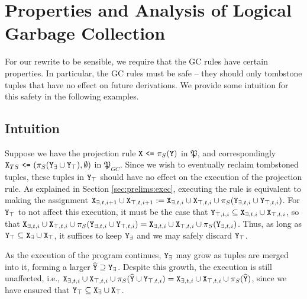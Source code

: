 
\section{Properties and Analysis of Logical Garbage Collection}
\label{sec:logical}
For our rewrite to be sensible, we require that the GC rules have certain properties.
In particular, the GC rules must be safe -- they should only tombstone tuples that have no effect on future derivations.
We provide some intuition for this safety in the following examples.

\setcounter{subsection}{-1}
\subsection{Intuition}
\begin{example}
Suppose we have the projection rule $\tt{X} ~\tt{<=}~ \pi_S(\tt{Y})$ in $\mathfrak{P}$, and correspondingly $\tt{X}_{TS} ~\tt{<=}~ (\pi_S(\tt{Y}_\exists \cup \tt{Y}_\top), \emptyset)$ in $\mathfrak{P}_{GC}$.
Since we wish to eventually reclaim tombstoned tuples, these tuples in $\tt{Y}_\top$ should have no effect on the execution of the projection rule.
As explained in Section \ref{sec:prelims:exec}, executing the rule is equivalent to making the assignment $\tt{X}_{\exists,t,i+1} \cup \tt{X}_{\top,t,i+1} := \tt{X}_{\exists,t,i} \cup \tt{X}_{\top,t,i} \cup \pi_S(\tt{Y}_{\exists,t,i} \cup \tt{Y}_{\top,t,i})$.
For $\tt{Y}_\top$ to not affect this execution, it must be the case that $\tt{Y}_{\top,t,i} \subseteq \tt{X}_{\exists,t,i} \cup \tt{X}_{\top,t,i}$, so that $\tt{X}_{\exists,t,i} \cup \tt{X}_{\top,t,i} \cup \pi_S(\tt{Y}_{\exists,t,i} \cup \tt{Y}_{\top,t,i}) = \tt{X}_{\exists,t,i} \cup \tt{X}_{\top,t,i} \cup \pi_S(\tt{Y}_{\exists,t,i})$.
Thus, as long as $\tt{Y}_\top \subseteq \tt{X}_\exists \cup \tt{X}_\top$, it suffices to keep $\tt{Y}_\exists$ and we may safely discard $\tt{Y}_\top$.

As the execution of the program continues, $\tt{Y}_\exists$ may grow as tuples are merged into it, forming a larger $\widehat{\tt{Y}} \supseteq \tt{Y}_\exists$.
Despite this growth, the execution is still unaffected, i.e., $\tt{X}_{\exists,t,i} \cup \tt{X}_{\top,t,i} \cup \pi_S(\widehat{\tt{Y}} \cup \tt{Y}_{\top,t,i}) = \tt{X}_{\exists,t,i} \cup \tt{X}_{\top,t,i} \cup \pi_S(\widehat{\tt{Y}})$, since we have ensured that $\tt{Y}_\top \subseteq \tt{X}_\exists \cup \tt{X}_\top$.
\end{example}

